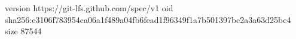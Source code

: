 version https://git-lfs.github.com/spec/v1
oid sha256:e3106f783954ca06a1f489a04fb6fead1f96349f1a7b501397bc2a3a63d25bc4
size 87544
